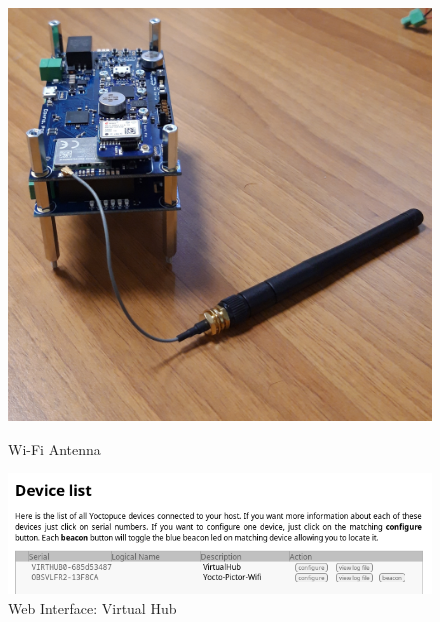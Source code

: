 \begin{figure}[!ht]
  \centering
  \begin{minipage}[b]{0.35\textwidth}
	  \includegraphics[width=\linewidth]{images/yoctopuce_wifi.jpg}
	\caption{Wi-Fi Antenna}
	\label{fig:yoctoAntenna}
  \end{minipage}
  \hfill
  \begin{minipage}[b]{0.55\textwidth}
	\includegraphics[width=\linewidth]{images/yocto1.png}
    \caption{Web Interface: Virtual Hub}
	\label{fig:screenyocto}
  \end{minipage}
\end{figure}

